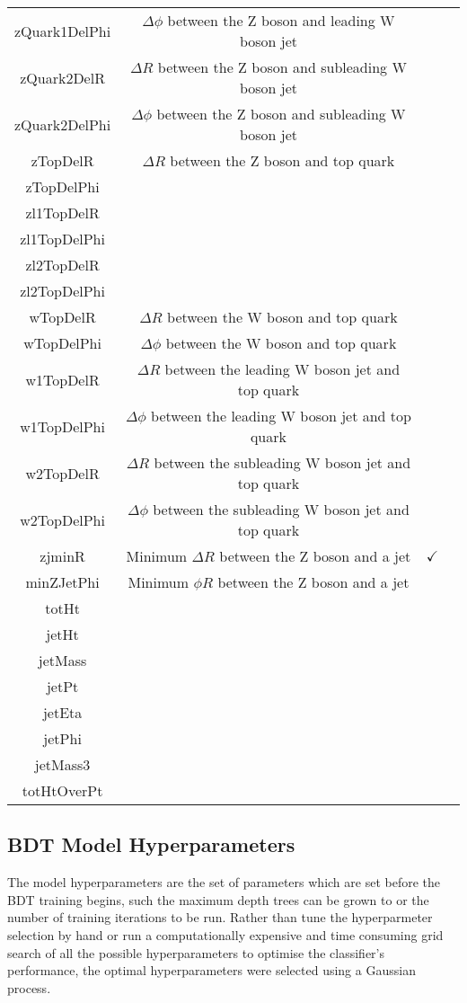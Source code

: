 \begin{table}[htbp]
{\begin{tabular}{cccc}
    zQuark1DelPhi & $\Delta \phi$ between the Z boson and leading W boson jet & \\
    zQuark2DelR & $\Delta R$ between the Z boson and subleading W boson jet & \\
    zQuark2DelPhi & $\Delta \phi$ between the Z boson and subleading W boson jet & \\
    zTopDelR & $\Delta R$ between the Z boson and top quark & \\
    zTopDelPhi & & \\
    zl1TopDelR & & \\
    zl1TopDelPhi & & \\
    zl2TopDelR & & \\
    zl2TopDelPhi & & \\
    wTopDelR & $\Delta R$ between the W boson and top quark & \\
    wTopDelPhi & $\Delta \phi$ between the W boson and top quark & \\
    w1TopDelR & $\Delta R$ between the leading W boson jet and top quark & \\
    w1TopDelPhi & $\Delta \phi$ between the leading W boson jet and top quark & \\
    w2TopDelR & $\Delta R$ between the subleading W boson jet and top quark & \\
    w2TopDelPhi & $\Delta \phi$ between the subleading W boson jet and top quark & \\
    zjminR & Minimum $\Delta R$ between the Z boson and a jet & $\checkmark$ \\
    minZJetPhi & Minimum $\phi R$ between the Z boson and a jet & \\
    totHt & & \\
    jetHt & & \\
    jetMass & & \\
    jetPt & & \\
    jetEta & & \\
    jetPhi & & \\
    jetMass3 & & \\
    totHtOverPt & & \\
   \hline
 \end{tabular}}
\end{table}

\subsection{BDT Model Hyperparameters}
The model hyperparameters are the set of parameters which are set before the BDT training begins, such the maximum depth trees can be grown to or the number of training iterations to be run. 
Rather than tune the hyperparmeter selection by hand or run a computationally expensive and time consuming grid search of all the possible hyperparameters to optimise the classifier's performance, the optimal hyperparameters were selected using a Gaussian process.


